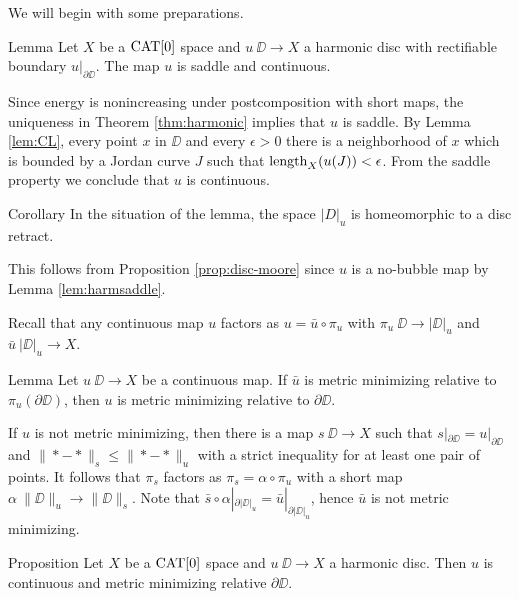 \documentclass[a4paper,10pt]{amsart}
\begin{document}
We will begin with some preparations. 


\begin{thm}{Lemma}\label{lem:harmsaddle}
Let $X$ be a $\mathop{\rm CAT}\nolimits[0]$ space and
$u\:\DD\to X$ a harmonic disc with rectifiable boundary $u|_{\partial \DD}$.
The map $u$ is saddle and continuous.
\end{thm}

Since energy is nonincreasing under postcomposition with short maps, the uniqueness in Theorem \ref{thm:harmonic} implies that
$u$ is saddle. By Lemma \ref{lem:CL}, every point $x$ in $\DD$ and every $\epsilon>0$
there is a neighborhood of $x$ which is bounded by a Jordan curve $J$ such that $\mathop{\rm length}\nolimits_X(u(J))<\epsilon$. From the saddle property we conclude 
that $u$ is continuous.
\qeds

\begin{thm}{Corollary}\label{cor:harmdiscretract}
In the situation of the lemma, the space $|D|_u$ is homeomorphic to a disc retract.
\end{thm}
This follows from Proposition \ref{prop:disc-moore} since $u$ is a no-bubble map by Lemma \ref{lem:harmsaddle}.
\qeds

Recall that any continuous map $u$ factors as $u=\bar u\circ \pi_u$ with $\pi_u\:\DD\to|\DD|_u$ and $\bar u\:|\DD|_u\to X$.


\begin{thm}{Lemma}\label{lem:memicrit}
Let $u\:\DD\to X$ be a continuous map. 
If $\bar u$ is metric minimizing relative to $\pi_u(\partial\DD)$, then $u$ is metric minimizing relative to $\partial\DD$.
\end{thm}

If $u$ is not metric minimizing, then there is a map $s\:\DD\to X$ such that $s|_{\partial\DD}=u|_{\partial\DD}$ and $\|*-*\|_s\leq \|*-*\|_u$
with a strict inequality for at least one pair of points. It follows that $\pi_s$ factors as $\pi_s=\alpha\circ\pi_u$ with a short  map $\alpha\:\|\DD\|_u\to\|\DD\|_s$.
Note that $\bar s\circ\alpha|_{\partial|\DD|_u}=\bar u|_{\partial|\DD|_u}$, hence $\bar u$ is not metric minimizing.
\qeds







 \begin{thm}{Proposition}\label{prop:harmonic}
Let $X$ be a $\mathop{\rm CAT}\nolimits[0]$ space 
and $u\:\DD\to X$ a harmonic disc.
Then $u$ is continuous and metric minimizing relative $\partial\DD$.
\end{thm}
\end{document}
